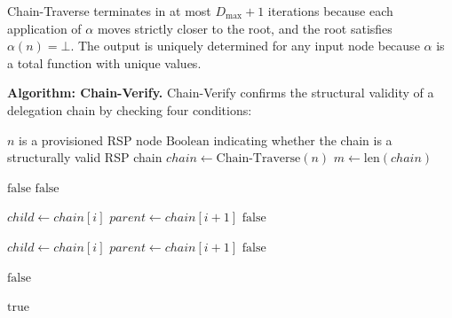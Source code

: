 Chain-Traverse terminates in at most $D_{\max} + 1$ iterations because each application of $\alpha$ moves strictly closer to the root, and the root satisfies $\alpha(n) = \bot$. The output is uniquely determined for any input node because $\alpha$ is a total function with unique values.

\medskip
\noindent\textbf{Algorithm: Chain-Verify.} Chain-Verify confirms the structural validity of a delegation chain by checking four conditions:

\begin{algorithm}
\caption{Chain-Verify($n$) --- Verify the authorization chain from node $n$ to human anchor}
\label{alg:chain-verify}
\begin{algorithmic}[1]
\REQUIRE $n$ is a provisioned RSP node
\ENSURE $\text{Boolean}$ indicating whether the chain is a structurally valid RSP chain
\STATE $chain \leftarrow \text{Chain-Traverse}(n)$
\STATE $m \leftarrow \text{len}(chain)$

\STATE {}
    \STATE \RETURN $\text{false}$ 
\ENDIF
{}
    \STATE \RETURN $\text{false}$ 
\ENDIF

\STATE {}
    \STATE $child \leftarrow chain[i]$
    \STATE $parent \leftarrow chain[i+1]$
        \STATE \RETURN $\text{false}$ 
    \ENDIF
\ENDFOR

\STATE {}
    \STATE $child \leftarrow chain[i]$
    \STATE $parent \leftarrow chain[i+1]$
        \STATE \RETURN $\text{false}$ 
    \ENDIF
\ENDFOR

\STATE {}
        \STATE \RETURN $\text{false}$ 
    \ENDIF
\ENDFOR

\RETURN $\text{true}$
\end{algorithmic}
\end{algorithm}

